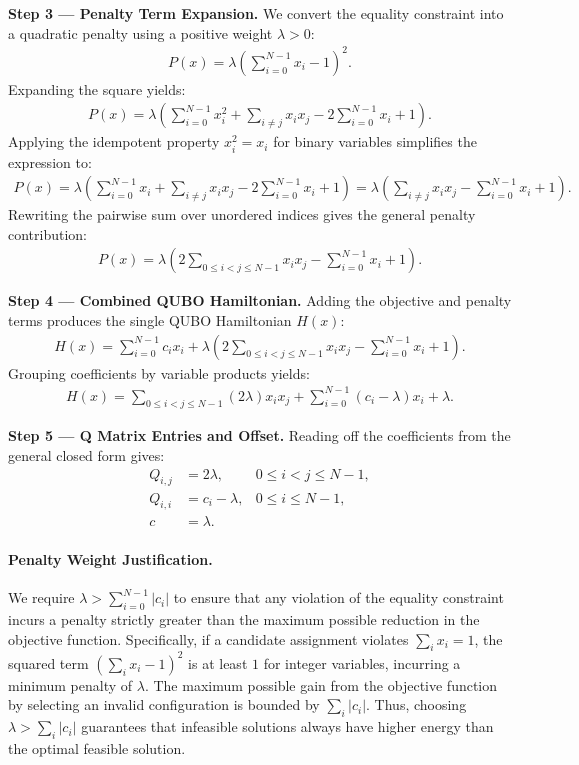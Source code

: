 \documentclass[12pt]{article}
\begin{document}
\textbf{Step 3 --- Penalty Term Expansion.} We convert the equality constraint into a quadratic penalty using a positive weight $\lambda > 0$:
\begin{align}
P(x) = \lambda \left( \sum_{i=0}^{N-1} x_i - 1 \right)^2.
\end{align}
Expanding the square yields:
\begin{align}
P(x) = \lambda \left( \sum_{i=0}^{N-1} x_i^2 + \sum_{i \neq j} x_i x_j - 2 \sum_{i=0}^{N-1} x_i + 1 \right).
\end{align}
Applying the idempotent property $x_i^2 = x_i$ for binary variables simplifies the expression to:
\begin{align}
P(x) = \lambda \left( \sum_{i=0}^{N-1} x_i + \sum_{i \neq j} x_i x_j - 2 \sum_{i=0}^{N-1} x_i + 1 \right) = \lambda \left( \sum_{i \neq j} x_i x_j - \sum_{i=0}^{N-1} x_i + 1 \right).
\end{align}
Rewriting the pairwise sum over unordered indices gives the general penalty contribution:
\begin{align}
P(x) = \lambda \left( 2 \sum_{0 \leq i < j \leq N-1} x_i x_j - \sum_{i=0}^{N-1} x_i + 1 \right).
\end{align}

\textbf{Step 4 --- Combined QUBO Hamiltonian.} Adding the objective and penalty terms produces the single QUBO Hamiltonian $H(x)$:
\begin{align}
H(x) = \sum_{i=0}^{N-1} c_i x_i + \lambda \left( 2 \sum_{0 \leq i < j \leq N-1} x_i x_j - \sum_{i=0}^{N-1} x_i + 1 \right).
\end{align}
Grouping coefficients by variable products yields:
\begin{align}
H(x) = \sum_{0 \leq i < j \leq N-1} (2\lambda) x_i x_j + \sum_{i=0}^{N-1} (c_i - \lambda) x_i + \lambda.
\end{align}

\textbf{Step 5 --- Q Matrix Entries and Offset.} Reading off the coefficients from the general closed form gives:
\begin{align}
Q_{i,j} &= 2\lambda, & 0 \leq i < j \leq N-1, \\
Q_{i,i} &= c_i - \lambda, & 0 \leq i \leq N-1, \\
c &= \lambda. &
\end{align}

\paragraph{Penalty Weight Justification.}
We require $\lambda > \sum_{i=0}^{N-1} |c_i|$ to ensure that any violation of the equality constraint incurs a penalty strictly greater than the maximum possible reduction in the objective function. Specifically, if a candidate assignment violates $\sum_i x_i = 1$, the squared term $\left( \sum_i x_i - 1 \right)^2$ is at least $1$ for integer variables, incurring a minimum penalty of $\lambda$. The maximum possible gain from the objective function by selecting an invalid configuration is bounded by $\sum_i |c_i|$. Thus, choosing $\lambda > \sum_i |c_i|$ guarantees that infeasible solutions always have higher energy than the optimal feasible solution.
\end{document}
